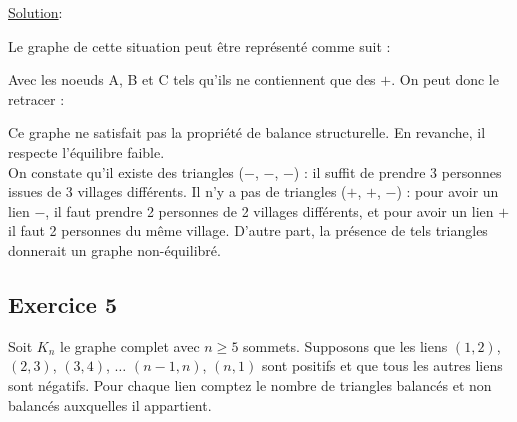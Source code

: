     \noindent \underline{Solution}:
    
    Le graphe de cette situation peut être représenté comme suit :
    \begin{center}    
    \end{center}
    
    Avec les noeuds A, B et C tels qu'ils ne contiennent que des $+$.
    On peut donc le retracer :
    
    \begin{center}
    \end{center}
    
    Ce graphe ne satisfait pas la propriété de balance structurelle.
    En revanche, il respecte l'équilibre faible.\\
    On constate qu'il existe des triangles ($-$, $-$, $-$) : il suffit de prendre 3 personnes issues de 3 villages différents.
    Il n'y a pas de triangles ($+$, $+$, $-$) : pour avoir un lien $-$, il faut prendre 2 personnes de 2 villages différents, et pour avoir un lien $+$ il faut 2 personnes du même village. D'autre part, la présence de tels triangles donnerait un graphe non-équilibré.


\subsection*{Exercice 5}
Soit $K_n$ le graphe complet avec $n \geq 5$ sommets. Supposons que les liens $(1, 2)$, $(2, 3)$, $(3, 4)$, $\ldots$ $(n - 1, n)$, $(n, 1)$ sont positifs et que tous les autres
liens sont n\'{e}gatifs. Pour chaque lien comptez le nombre de triangles balanc\'{e}s et non balanc\'{e}s auxquelles il appartient.

